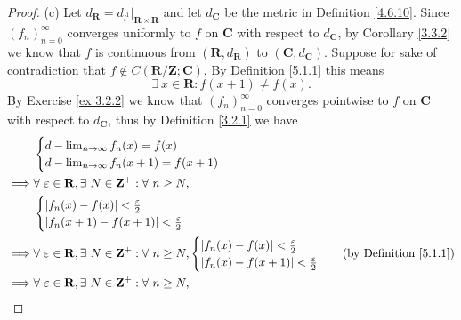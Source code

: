\begin{proof}{(c)}
    Let \(d_{\mathbf{R}} = d_{l^1}|_{\mathbf{R} \times \mathbf{R}}\) and let \(d_{\mathbf{C}}\) be the metric in Definition \ref{4.6.10}.
    Since \((f_n)_{n = 0}^\infty\) converges uniformly to \(f\) on \(\mathbf{C}\) with respect to \(d_{\mathbf{C}}\), by Corollary \ref{3.3.2} we know that \(f\) is continuous from \((\mathbf{R}, d_{\mathbf{R}})\) to \((\mathbf{C}, d_{\mathbf{C}})\).
    Suppose for sake of contradiction that \(f \notin C(\mathbf{R} / \mathbf{Z} ; \mathbf{C})\).
    By Definition \ref{5.1.1} this means
    \[
        \exists\ x \in \mathbf{R} : f(x + 1) \neq f(x).
    \]
    By Exercise \ref{ex 3.2.2} we know that \((f_n)_{n = 0}^\infty\) converges pointwise to \(f\) on \(\mathbf{C}\) with respect to \(d_{\mathbf{C}}\), thus by Definition \ref{3.2.1} we have
    \begin{align*}
                 & \begin{cases}
            d - \lim_{n \to \infty} f_n(x) = f(x) \\
            d - \lim_{n \to \infty} f_n(x + 1) = f(x + 1)
        \end{cases}                                                                                                                            \\
        \implies & \forall\ \varepsilon \in \mathbf{R}, \exists\ N \in \mathbf{Z}^+ : \forall\ n \geq N,                                                                 \\
                 & \begin{cases}
            \abs*{f_n(x) - f(x)} < \frac{\varepsilon}{2} \\
            \abs*{f_n(x + 1) - f(x + 1)} < \frac{\varepsilon}{2}
        \end{cases}                                                                                                                            \\
        \implies & \forall\ \varepsilon \in \mathbf{R}, \exists\ N \in \mathbf{Z}^+ : \forall\ n \geq N, \begin{cases}
            \abs*{f_n(x) - f(x)} < \frac{\varepsilon}{2} \\
            \abs*{f_n(x) - f(x + 1)} < \frac{\varepsilon}{2}
        \end{cases} & \text{(by Definition \ref{5.1.1})} \\
        \implies & \forall\ \varepsilon \in \mathbf{R}, \exists\ N \in \mathbf{Z}^+ : \forall\ n \geq N,                                                                 \\

\end{align*}
\end{proof}
